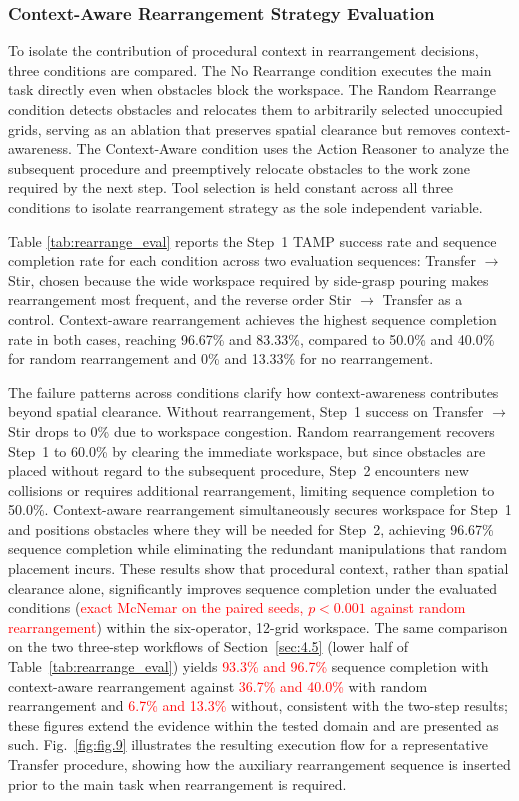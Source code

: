 \documentclass{ieeeaccess}
\newif\ifhighlight
\newcommand{\rev}[1]{\ifhighlight\hl{#1}\else#1\fi}
\newcommand{\nd}[1]{\textcolor{red}{#1}}
\begin{document}
\subsubsection{Context-Aware Rearrangement Strategy Evaluation}\label{sec:4.4.2}
To isolate the contribution of procedural context in rearrangement decisions, three conditions are compared. The No Rearrange condition executes the main task directly even when obstacles block the workspace. The Random Rearrange condition detects obstacles and relocates them to arbitrarily selected unoccupied grids, serving as an ablation that preserves spatial clearance but removes context-awareness. The Context-Aware condition uses the Action Reasoner to analyze the subsequent procedure and preemptively relocate obstacles to the work zone required by the next step. Tool selection is held constant across all three conditions to isolate rearrangement strategy as the sole independent variable.



Table \ref{tab:rearrange_eval} reports the Step~1 TAMP success rate and sequence completion rate for each condition across two evaluation sequences: Transfer $\rightarrow$ Stir, chosen because the wide workspace required by side-grasp pouring makes rearrangement most frequent, and the reverse order Stir $\rightarrow$ Transfer as a control. Context-aware rearrangement achieves the highest sequence completion rate in both cases, reaching 96.67\% and 83.33\%, compared to 50.0\% and 40.0\% for random rearrangement and 0\% and 13.33\% for no rearrangement.

The failure patterns across conditions clarify how context-awareness contributes beyond spatial clearance. Without rearrangement, Step~1 success on Transfer $\rightarrow$ Stir drops to 0\% due to workspace congestion. Random rearrangement recovers Step~1 to 60.0\% by clearing the immediate workspace, but since obstacles are placed without regard to the subsequent procedure, Step~2 encounters new collisions or requires additional rearrangement, limiting sequence completion to 50.0\%. Context-aware rearrangement simultaneously secures workspace for Step~1 and positions obstacles where they will be needed for Step~2, achieving 96.67\% sequence completion while eliminating the redundant manipulations that random placement incurs. \rev{These results show that procedural context, rather than spatial clearance alone, significantly improves sequence completion under the evaluated conditions (\nd{exact McNemar on the paired seeds, $p<0.001$ against random rearrangement}) within the six-operator, 12-grid workspace.
The same comparison on the two three-step workflows of Section~\ref{sec:4.5} (lower half of Table~\ref{tab:rearrange_eval}) yields \nd{93.3\% and 96.7\%} sequence completion with context-aware rearrangement against \nd{36.7\% and 40.0\%} with random rearrangement and \nd{6.7\% and 13.3\%} without, consistent with the two-step results; these figures extend the evidence within the tested domain and are presented as such.}
Fig.~\ref{fig:fig.9} illustrates the resulting execution flow for a representative Transfer procedure, showing how the auxiliary rearrangement sequence is inserted prior to the main task when rearrangement is required.
\end{document}
